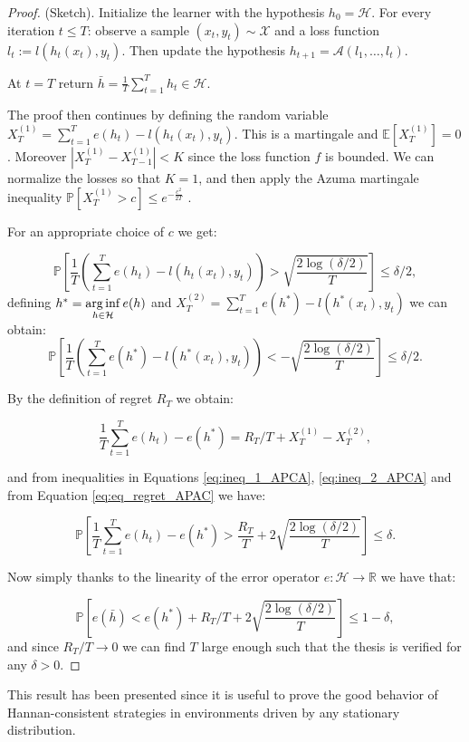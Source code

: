 \begin{proof}(Sketch).
Initialize the learner with the hypothesis $h_0=\mathcal H$.
For every iteration $t\le T$: observe a sample $(x_t,y_t)\sim\mathcal X$ and a loss function $l_t:=l(h_t(x_t),y_t)$. Then update the hypothesis $h_{t+1}=\mathcal A(l_1,\ldots,l_t)$.

At $t=T$ return $\bar{h}=\frac{1}{T}\sum\limits_{t=1}^T h_t\in\mathcal H$. 

The proof then continues by defining the random variable $X^{(1)}_T=\sum\limits_{t=1}^Te(h_t)-l(h_t(x_t),y_t)$. This is a martingale and $\mathbb E[X^{(1)}_T]=0$. Moreover $|X^{(1)}_T-X^{(1)}_{T-1}|<K$ since the loss function $f$ is bounded. We can normalize the losses so that $K=1$, and then apply the Azuma martingale inequality $\mathbb P[X^{(1)}_T>c]\le e^{-\frac{c^2}{2T}}$ \cite{azuma1967weighted}.

For an appropriate choice of $c$ we get:

\begin{equation}\label{eq:ineq_1_APCA}
\mathbb P\left[\frac{1}{T}\left(\sum\limits_{t=1}^Te(h_t)-l(h_t(x_t),y_t)\right)>\sqrt{\frac{2\log(\delta/2)}{T}}\right]\le \delta/2,
\end{equation}
defining $h^*=\operatorname*{arg\,inf}\limits_{h\in\mathcal H} e(h)$ and $X^{(2)}_T=\sum\limits_{t=1}^Te(h^*)-l(h^*(x_t),y_t)$ we can obtain:
\begin{equation}\label{eq:ineq_2_APCA}
\mathbb P\left[\frac{1}{T}\left(\sum\limits_{t=1}^Te(h^*)-l(h^*(x_t),y_t)\right)<-\sqrt{\frac{2\log(\delta/2)}{T}}\right]\le \delta/2.
\end{equation}

By the definition of regret $R_T$ we obtain:

\begin{equation}\label{eq:eq_regret_APAC}
\frac{1}{T}\sum\limits_{t=1}^Te(h_t)-e(h^*)=R_T/T+X_T^{(1)}-X_T^{(2)},
\end{equation}

and from inequalities in Equations \eqref{eq:ineq_1_APCA}, \eqref{eq:ineq_2_APCA} and from Equation \eqref{eq:eq_regret_APAC} we have:

\begin{equation}
\mathbb P\left[\frac{1}{T}\sum\limits_{t=1}^Te(h_t)-e(h^*)>\frac{R_T}{T}+2\sqrt{\frac{2\log(\delta/2)}{T}}\right]\le \delta.
\end{equation}

Now simply thanks to the linearity of the error operator $e:\mathcal H\to \mathbb R$ we have that: 

\begin{equation*}
\mathbb P\left[e(\bar h)<e(h^*)+R_T/T+2\sqrt{\frac{2\log(\delta/2)}{T}}\right]\le 1-\delta,
\end{equation*}
and since $R_T/T\to0$ we can find $T$ large enough such that the thesis is verified for any $\delta>0$.
\end{proof}

This result has been presented since it is useful to prove the good behavior of Hannan-consistent strategies in environments driven by any stationary distribution.